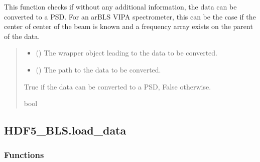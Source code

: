 \documentclass[letterpaper,10pt,english]{sphinxmanual}
\begin{document}
\begin{fulllineitems}
\label{\detokenize{_autosummary/HDF5_BLS.conversion_PSD:HDF5_BLS.conversion_PSD.check_conversion_ar_BLS_VIPA}}
\pysigstartsignatures
\pysiglinewithargsret
{}
{\sphinxparamcomma {}}
{}
\pysigstopsignatures
\sphinxAtStartPar
This function checks if without any additional information, the data can be converted to a PSD. For an ar\sphinxhyphen{}BLS VIPA spectrometer, this can be the case if the center of center of the beam is known and a frequency array exists on the parent of the data.
\begin{quote}\begin{description}
\begin{itemize}
\item {} 
\sphinxAtStartPar
{} ({\hyperref[\detokenize{_autosummary/HDF5_BLS.wrapper:HDF5_BLS.wrapper.Wrapper}]{}}) \textendash{} The wrapper object leading to the data to be converted.

\item {} 
\sphinxAtStartPar
{} () \textendash{} The path to the data to be converted.

\end{itemize}

\sphinxAtStartPar
True if the data can be converted to a PSD, False otherwise.

\sphinxAtStartPar
bool

\end{description}\end{quote}

\end{fulllineitems}


\sphinxstepscope


\subsection{HDF5\_BLS.load\_data}
\label{\detokenize{_autosummary/HDF5_BLS.load_data:module-HDF5_BLS.load_data}}\label{\detokenize{_autosummary/HDF5_BLS.load_data:hdf5-bls-load-data}}\label{\detokenize{_autosummary/HDF5_BLS.load_data::doc}}\subsubsection*{Functions}
\end{document}
